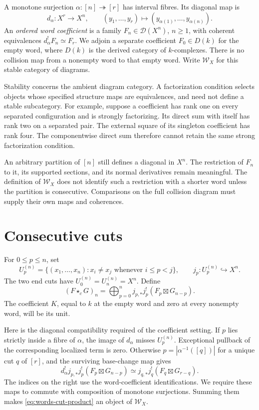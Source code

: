 A monotone surjection \(\alpha:[n]\twoheadrightarrow[r]\) has interval
fibres.  Its diagonal map is
\[
 d_\alpha:X^r\longrightarrow X^n,
 \qquad (y_1,\ldots,y_r)\longmapsto
 (y_{\alpha(1)},\ldots,y_{\alpha(n)}).
\]
An \emph{ordered word coefficient} is a family
\(F_n\in\mathscr D(X^n)\), \(n\geq1\), with coherent equivalences
\(d_\alpha^!F_n\simeq F_r\).  We adjoin a separate coefficient
\(F_0\in D(k)\) for the empty word, where \(D(k)\) is the derived
category of \(k\)-complexes.  There is no collision map from a
nonempty word to that empty word.  Write \(\mathscr W_X\) for this
stable category of diagrams.

Stability concerns the ambient diagram category.  A factorization
condition selects objects whose specified structure maps are
equivalences, and need not define a stable subcategory.  For example,
suppose a coefficient has rank one on every separated configuration
and is strongly factorizing.  Its direct sum with itself has rank two
on a separated pair.  The external square of its singleton coefficient
has rank four.  The componentwise direct sum therefore cannot retain
the same strong factorization condition.

An arbitrary partition of \([n]\) still defines a diagonal in \(X^n\).
The restriction of \(F_n\) to it, its supported sections, and its normal
derivatives remain meaningful.  The definition of \(\mathscr W_X\)
does not identify such a restriction with a shorter word unless the
partition is consecutive.  Comparisons on the full collision diagram
must supply their own maps and coherences.

\section{Consecutive cuts}

For \(0\leq p\leq n\), set
\[
 U_p^{(n)}=
 \{(x_1,\ldots,x_n):x_i\neq x_j\text{ whenever }i\leq p<j\},
 \qquad j_p:U_p^{(n)}\hookrightarrow X^n.
\]
The two end cuts have \(U_0^{(n)}=U_n^{(n)}=X^n\).  Define
\begin{equation}
 (F\star_c G)_n=
 \bigoplus_{p=0}^n
 j_{p,*}j_p^!(F_p\boxtimes G_{n-p}).
 \label{eq:words-cut-product}
\end{equation}
The coefficient \(K\), equal to \(k\) at the empty word and zero at
every nonempty word, will be its unit.

Here is the diagonal compatibility required of the coefficient
setting.  If \(p\) lies strictly inside a fibre of \(\alpha\), the
image of \(d_\alpha\) misses \(U_p^{(n)}\).  Exceptional pullback of
the corresponding localized term is zero.  Otherwise
\(p=|\alpha^{-1}([q])|\) for a unique cut \(q\) of \([r]\), and
the surviving base-change map gives
\begin{equation}
 d_\alpha^!j_{p,*}j_p^!(F_p\boxtimes G_{n-p})
 \simeq j_{q,*}j_q^!(F_q\boxtimes G_{r-q}).
 \label{eq:words-diagonal-cut}
\end{equation}
The indices on the right use the word-coefficient identifications.
We require these maps to commute with composition of monotone
surjections.  Summing them makes \eqref{eq:words-cut-product} an
object of \(\mathscr W_X\).

